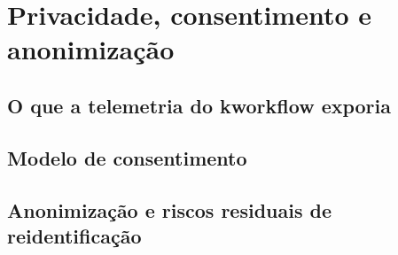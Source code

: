 
\chapter{Privacidade, consentimento e anonimização}

\label{cap:privacidade}

\section{O que a telemetria do kworkflow exporia}

\section{Modelo de consentimento}

\section{Anonimização e riscos residuais de reidentificação}
